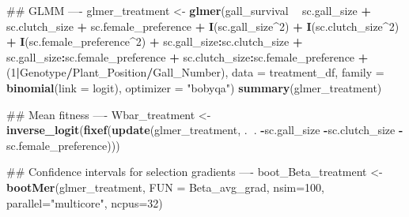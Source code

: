 \documentclass[]{elsarticle} %
\newenvironment{Shaded}{\begin{snugshade}}{\end{snugshade}}
\newcommand{\KeywordTok}[1]{\textcolor[rgb]{0.13,0.29,0.53}{\textbf{#1}}}
\newcommand{\DataTypeTok}[1]{\textcolor[rgb]{0.13,0.29,0.53}{#1}}
\newcommand{\DecValTok}[1]{\textcolor[rgb]{0.00,0.00,0.81}{#1}}
\newcommand{\StringTok}[1]{\textcolor[rgb]{0.31,0.60,0.02}{#1}}
\newcommand{\OperatorTok}[1]{\textcolor[rgb]{0.81,0.36,0.00}{\textbf{#1}}}
\newcommand{\NormalTok}[1]{#1}
\begin{document}
\begin{Shaded}
\begin{Highlighting}[]
\NormalTok{## GLMM ----}
\NormalTok{glmer_treatment <-}\StringTok{ }\KeywordTok{glmer}\NormalTok{(gall_survival }\OperatorTok{~}\StringTok{ }\NormalTok{sc.gall_size }\OperatorTok{+}\StringTok{ }\NormalTok{sc.clutch_size }\OperatorTok{+}\StringTok{ }\NormalTok{sc.female_preference }\OperatorTok{+}
\StringTok{                         }\KeywordTok{I}\NormalTok{(sc.gall_size}\OperatorTok{^}\DecValTok{2}\NormalTok{) }\OperatorTok{+}\StringTok{ }\KeywordTok{I}\NormalTok{(sc.clutch_size}\OperatorTok{^}\DecValTok{2}\NormalTok{) }\OperatorTok{+}\StringTok{ }\KeywordTok{I}\NormalTok{(sc.female_preference}\OperatorTok{^}\DecValTok{2}\NormalTok{) }\OperatorTok{+}
\StringTok{                         }\NormalTok{sc.gall_size}\OperatorTok{:}\NormalTok{sc.clutch_size }\OperatorTok{+}\StringTok{ }
\StringTok{                          }\NormalTok{sc.gall_size}\OperatorTok{:}\NormalTok{sc.female_preference }\OperatorTok{+}\StringTok{ }
\StringTok{                           }\NormalTok{sc.clutch_size}\OperatorTok{:}\NormalTok{sc.female_preference }\OperatorTok{+}
\StringTok{                           }\NormalTok{(}\DecValTok{1}\OperatorTok{|}\NormalTok{Genotype}\OperatorTok{/}\NormalTok{Plant_Position}\OperatorTok{/}\NormalTok{Gall_Number),}
                         \DataTypeTok{data =}\NormalTok{ treatment_df,}
                         \DataTypeTok{family =} \KeywordTok{binomial}\NormalTok{(}\DataTypeTok{link =}\NormalTok{ logit), }\DataTypeTok{optimizer =} \StringTok{"bobyqa"}\NormalTok{)}
\KeywordTok{summary}\NormalTok{(glmer_treatment)}

\NormalTok{## Mean fitness ----}
\NormalTok{Wbar_treatment <-}\StringTok{ }\KeywordTok{inverse_logit}\NormalTok{(}\KeywordTok{fixef}\NormalTok{(}\KeywordTok{update}\NormalTok{(glmer_treatment, .}\OperatorTok{~}\NormalTok{. }\OperatorTok{-}\NormalTok{sc.gall_size }\OperatorTok{-}\NormalTok{sc.clutch_size }\OperatorTok{-}\NormalTok{sc.female_preference)))}

\NormalTok{## Confidence intervals for selection gradients ----}
\NormalTok{boot_Beta_treatment <-}\StringTok{ }\KeywordTok{bootMer}\NormalTok{(glmer_treatment, }\DataTypeTok{FUN =}\NormalTok{ Beta_avg_grad, }\DataTypeTok{nsim=}\DecValTok{100}\NormalTok{, }\DataTypeTok{parallel=}\StringTok{"multicore"}\NormalTok{, }\DataTypeTok{ncpus=}\DecValTok{32}\NormalTok{)}


\end{Highlighting}
\end{Shaded}
\end{document}
